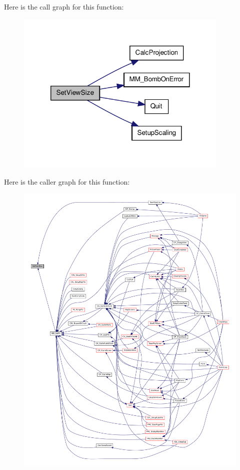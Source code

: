 Here is the call graph for this function:
\nopagebreak
\begin{figure}[H]
\begin{center}
\leavevmode
\includegraphics[width=288pt]{WL__DEF_8H_af74ea12ed1f33b5eb32cee5062ea034c_cgraph}
\end{center}
\end{figure}




Here is the caller graph for this function:
\nopagebreak
\begin{figure}[H]
\begin{center}
\leavevmode
\includegraphics[width=400pt]{WL__DEF_8H_af74ea12ed1f33b5eb32cee5062ea034c_icgraph}
\end{center}
\end{figure}


